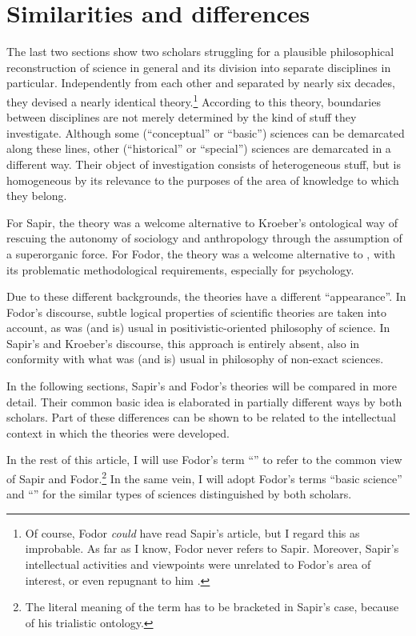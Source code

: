 \documentclass[output=paper]{langscibook}
\begin{document}
\section{Similarities and differences}
\label{sec:elffers:similaritiesdiffs}
The last two sections show two scholars struggling for a plausible philosophical reconstruction of science in general and its division into separate disciplines in particular. Independently from each other and separated by nearly six decades, they devised a nearly identical theory.\footnote{Of course, Fodor \emph{could} have read Sapir's article, but I regard this as improbable. As far as I know, Fodor never refers to Sapir. Moreover, Sapir's intellectual activities and viewpoints were unrelated to Fodor's area of interest, or even repugnant to him \citep[cf.][]{Pullum2017}.} According to this theory, boundaries between disciplines are not merely determined by the kind of stuff they investigate. Although some (``conceptual'' or ``basic'') sciences can be demarcated along these lines, other (``historical'' or ``special'') sciences are demarcated in a different way. Their object of investigation consists of heterogeneous stuff, but is homogeneous by its relevance to the purposes of the area of knowledge to which they belong.

For Sapir, the theory was a welcome alternative to Kroeber's ontological way of rescuing the autonomy of sociology and anthropology through the assumption of a superorganic force. For Fodor, the theory was a welcome alternative to , with its problematic methodological requirements, especially for psychology.

Due to these different backgrounds, the theories have a different ``appearance''. In Fodor's discourse, subtle logical properties of scientific theories are taken into account, as was (and is) usual in positivistic-oriented philosophy of science. In Sapir's and Kroeber's discourse, this approach is entirely absent, also in conformity with what was (and is) usual in philosophy of non-exact sciences.

In the following sections, Sapir's and Fodor's theories will be compared in more detail. Their common basic idea is elaborated in partially different ways by both scholars. Part of these differences can be shown to be related to the intellectual context in which the theories were developed.

In the rest of this article, I will use Fodor's term ``'' to refer to the common view of Sapir and Fodor.\footnote{The literal meaning of the term has to be bracketed in Sapir's case, because of his trialistic ontology.} In the same vein, I will adopt Fodor's terms ``basic science'' and ``'' for the similar types of sciences distinguished by both scholars.
\end{document}
